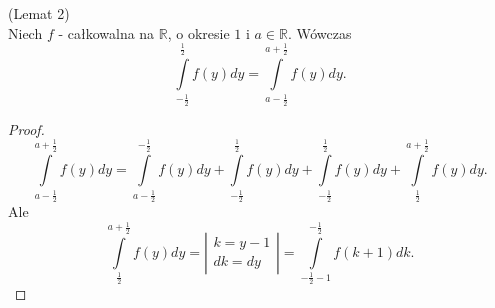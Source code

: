 \documentclass[../main.tex]{subfiles}
\begin{document}
\begin{tw}
    (Lemat 2)\\
    Niech $f$ - całkowalna na $\mathbb{R}$, o okresie $1$ i $a\in \mathbb{R}$. Wówczas
    \[
        \int\limits_{-\frac{1}{2}}^{\frac{1}{2}} f(y)dy = \int\limits_{a-\frac{1}{2}}^{a+\frac{1}{2}} f(y)dy
    .\]
\end{tw}
\begin{proof}
\[
    \int\limits_{a-\frac{1}{2}}^{a+\frac{1}{2}} f(y)dy = \int\limits_{a-\frac{1}{2}}^{-\frac{1}{2}} f(y)dy + \int\limits_{-\frac{1}{2}}^{\frac{1}{2}} f(y)dy + \int\limits_{-\frac{1}{2}}^{\frac{1}{2}} f(y)dy + \int\limits_{\frac{1}{2}}^{a+\frac{1}{2}} f(y)dy
.\]
Ale
\[
    \int\limits_{\frac{1}{2}}^{a+\frac{1}{2}} f(y)dy = \left| \begin{matrix} k = y-1\\ dk = dy \end{matrix}  \right| = \int\limits_{-\frac{1}{2} - 1}^{-\frac{1}{2}} f(k+1)dk
.\]
\end{proof}
\end{document}
